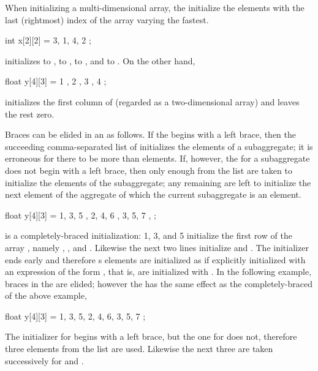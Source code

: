 \pnum
When initializing a multi-dimensional array,
the
initialize the elements with the last (rightmost) index of the array
varying the fastest.
\begin{example}
\begin{codeblock}
int x[2][2] = { 3, 1, 4, 2 };
\end{codeblock}
initializes
to
,
to
,
to
,
and
to
.
On the other hand,
\begin{codeblock}
float y[4][3] = {
  { 1 }, { 2 }, { 3 }, { 4 }
};
\end{codeblock}
initializes the first column of
(regarded as a two-dimensional array)
and leaves the rest zero.
\end{example}

\pnum
Braces can be elided in an
as follows.
If the
begins with a left brace,
then the succeeding comma-separated list of
initializes the elements of a subaggregate;
it is erroneous for there to be more
than elements.
If, however, the
for a subaggregate does not begin with a left brace,
then only enough
from the list are taken to initialize the elements of the subaggregate;
any remaining
are left to initialize the next element of the aggregate
of which the current subaggregate is an element.
\begin{example}
\begin{codeblock}
float y[4][3] = {
  { 1, 3, 5 },
  { 2, 4, 6 },
  { 3, 5, 7 },
};
\end{codeblock}
is a completely-braced initialization:
1, 3, and 5 initialize the first row of the array
,
namely
,
,
and
.
Likewise the next two lines initialize
and
.
The initializer ends early and therefore
s
elements are initialized as if explicitly initialized with an
expression of the form
,
that is, are initialized with
.
In the following example, braces in the
are elided;
however the
has the same effect as the completely-braced
of the above example,
\begin{codeblock}
float y[4][3] = {
  1, 3, 5, 2, 4, 6, 3, 5, 7
};
\end{codeblock}

The initializer for
begins with a left brace, but the one for
does not,
therefore three elements from the list are used.
Likewise the next three are taken successively for
and
.
\end{example}


